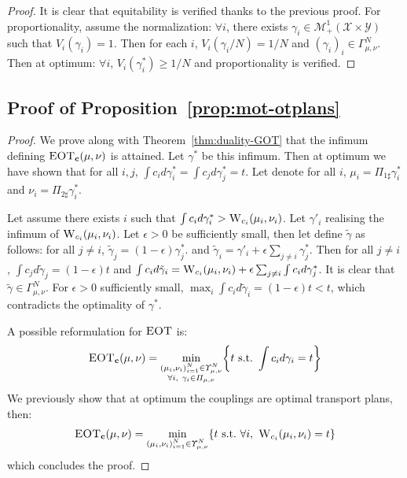 \begin{proof}
It is clear that equitability is verified thanks to the previous proof. For proportionality, assume the normalization:  $\forall i$, there exists $\gamma_i\in\mathcal{M}_+^1(\mathcal{X}\times\mathcal{Y})$ such that $V_i(\gamma_i)=1$. Then for each $i$, $V_i(\gamma_i/N)=1/N$ and $(\gamma_i)_i\in\Gamma^N_{\mu,\nu}$. Then at optimum: $\forall i$, $V_i(\gamma_i^*)\geq 1/N$ and proportionality is verified.


\end{proof}

\subsection{Proof of Proposition~\ref{prop:mot-otplans}}
\label{prv:mot-otplans}

\begin{proof}

 
We prove along with Theorem~\ref{thm:duality-GOT} that the infimum defining $\textsc{EOT}_\mathbf{c}(\mu,\nu)$ is attained. Let $\gamma^*$ be this infimum. Then at optimum we have shown that for all $i,j$, $\int c_id\gamma^*_i=\int c_jd\gamma^*_j = t$. Let denote for all $i$, $\mu_i=\Pi_{1\sharp}\gamma^*_i$ and $\nu_i=\Pi_{2\sharp}\gamma^*_i$. 

Let assume there exists $i$ such that $\int c_i d\gamma^*_i>\textsc{W}_{c_i}(\mu_i,\nu_i)$. Let $\gamma'_i$ realising the infimum of $\textsc{W}_{c_i}(\mu_i,\nu_i)$. Let $\epsilon>0$ be sufficiently small, then let define $\tilde{\gamma}$ as follows: for all $j\neq i$, $\tilde{\gamma}_j=(1-\epsilon)\gamma^*_j$. and $\tilde{\gamma}_i = \gamma'_i+\epsilon \sum_{j\neq i}\gamma^*_j$.
Then for all $j\neq i$, $\int c_j d \tilde{\gamma}_j = (1-\epsilon) t$ and $\int c_i d \tilde{\gamma}_i = \textsc{W}_{c_i}(\mu_i,\nu_i)+\epsilon \sum_{j\neq i} \int c_id\gamma^*_j$. It is clear that $\tilde{\gamma}\in \Gamma^N_{\mu,\nu}$. For $\epsilon>0$ sufficiently small, $\max_i\int c_id\tilde{\gamma}_i = (1-\epsilon) t<t$, which contradicts the optimality of $\gamma^*$.

A possible reformulation for $\textsc{EOT}$ is:
\begin{align*}
\MOT_\mathbf{c}(\mu,\nu) = \min_{\substack{(\mu_i,\nu_i)_{i=1}^N\in\Upsilon^N_{\mu,\nu}\\ \forall i,~\gamma_i\in\Pi_{\mu,\nu}}}\left\{t~\mathrm{s.t.}~\int c_id\gamma_i=t\right\}
\end{align*}
We previously show that at optimum the couplings are optimal transport plans, then:
\begin{align*}
\MOT_\mathbf{c}(\mu,\nu) =\min_{\substack{(\mu_i,\nu_i)_{i=1}^N\in\Upsilon^N_{\mu,\nu}}} \left\{t~\mathrm{s.t.}~ \forall i,~ \wass_{c_i}(\mu_i,\nu_i) =t\right\}
\end{align*}
which concludes the proof.
\end{proof}


